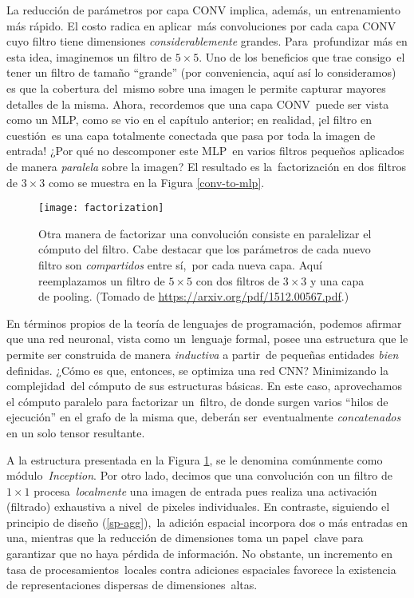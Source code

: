 La reducción de parámetros por capa CONV implica, además, un entrenamiento más rápido. El costo radica en aplicar\
más convoluciones por cada capa CONV cuyo filtro tiene dimensiones \emph{considerablemente} grandes. Para\
profundizar más en esta idea, imaginemos un filtro de $5 \times 5$. Uno de los beneficios que trae consigo\
el tener un filtro de tamaño ``grande'' (por conveniencia, aquí así lo consideramos) es que la cobertura del\
mismo sobre una imagen le permite capturar mayores detalles de la misma. Ahora, recordemos que una capa CONV\
puede ser vista como un MLP, como se vio en el capítulo anterior; en realidad, ¡el filtro en cuestión\
es una capa totalmente conectada que pasa por toda la imagen de entrada! ¿Por qué no descomponer este MLP\
en varios filtros pequeños aplicados de manera \emph{paralela} sobre la imagen? El resultado es la\
factorización en dos filtros de $3 \times 3$ como se muestra en la Figura \ref{conv-to-mlp}.\par

\begin{figure}[H]
  \centering
  \texttt{[image: factorization]}
  \caption{Otra manera de factorizar una convolución consiste en paralelizar el cómputo del filtro.
    Cabe destacar que los parámetros de cada nuevo filtro son \emph{compartidos} entre sí,\
    por cada nueva capa. Aquí reemplazamos un filtro de $5 \times 5$ con dos filtros de $3 \times 3$
    y una capa de pooling.
    (Tomado de \url{https://arxiv.org/pdf/1512.00567.pdf}.)}
  \label{factorization}
\end{figure}

En términos propios de la teoría de lenguajes de programación, podemos afirmar que una red neuronal, vista como un\
lenguaje formal, posee una estructura que le permite ser construida de manera \emph{inductiva} a partir\
de pequeñas entidades \emph{bien} definidas. ¿Cómo es que, entonces, se optimiza una red CNN? Minimizando la complejidad\
del cómputo de sus estructuras básicas. En este caso, aprovechamos el cómputo paralelo para factorizar un\
filtro, de donde surgen varios ``hilos de ejecución'' en el grafo de la misma que, deberán ser\
eventualmente \emph{concatenados} en un solo tensor resultante.\par
A la estructura presentada en la Figura \ref{factorization}, se le denomina comúnmente como módulo\
\emph{Inception}. Por otro lado, decimos que una convolución con un filtro de $1 \times 1$ procesa\
\emph{localmente} una imagen de entrada pues realiza una activación (filtrado) exhaustiva a nivel\
de pixeles individuales. En contraste, siguiendo el principio de diseño (\ref{sp-agg}),\
la adición espacial incorpora dos o más entradas en una, mientras que la reducción de dimensiones toma un papel\
clave para garantizar que no haya pérdida de información. No obstante, un incremento en tasa de procesamientos\
locales contra adiciones espaciales favorece la existencia de representaciones dispersas de dimensiones\
altas.

